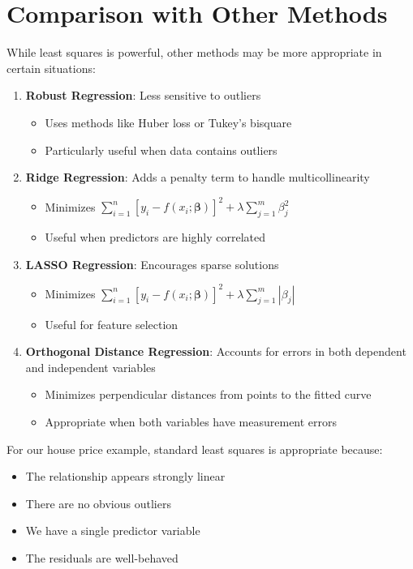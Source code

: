 \documentclass[12pt]{article}
\begin{document}
\section{Comparison with Other Methods}

While least squares is powerful, other methods may be more appropriate in certain situations:

\begin{enumerate}
    \item \textbf{Robust Regression}: Less sensitive to outliers
    \begin{itemize}
        \item Uses methods like Huber loss or Tukey's bisquare
        \item Particularly useful when data contains outliers
    \end{itemize}

    \item \textbf{Ridge Regression}: Adds a penalty term to handle multicollinearity
    \begin{itemize}
        \item Minimizes $\sum_{i=1}^{n} [y_i - f(x_i; \boldsymbol{\beta})]^2 + \lambda\sum_{j=1}^{m} \beta_j^2$
        \item Useful when predictors are highly correlated
    \end{itemize}

    \item \textbf{LASSO Regression}: Encourages sparse solutions
    \begin{itemize}
        \item Minimizes $\sum_{i=1}^{n} [y_i - f(x_i; \boldsymbol{\beta})]^2 + \lambda\sum_{j=1}^{m} |\beta_j|$
        \item Useful for feature selection
    \end{itemize}

    \item \textbf{Orthogonal Distance Regression}: Accounts for errors in both dependent and independent variables
    \begin{itemize}
        \item Minimizes perpendicular distances from points to the fitted curve
        \item Appropriate when both variables have measurement errors
    \end{itemize}
\end{enumerate}

For our house price example, standard least squares is appropriate because:
\begin{itemize}
    \item The relationship appears strongly linear
    \item There are no obvious outliers
    \item We have a single predictor variable
    \item The residuals are well-behaved
\end{itemize}
\end{document}
